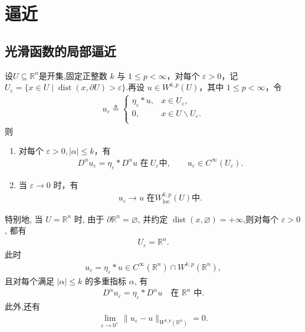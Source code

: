 \documentclass[../../main.tex]{subfiles}
\begin{document}
\section{逼近}\label{section:ch05-逼近}

\subsection{光滑函数的局部逼近}\label{subsection:ch05-内部逼近}

\begin{theorem}[光滑函数的局部逼近定理]\label{theorem:ch05-光滑函数的局部逼近定理}
设$U\subseteq \mathbb{R}^n$是开集,固定正整数 $k$ 与 $1\leqslant p<\infty$，对每个 $\varepsilon>0$，记$U_{\varepsilon}=\{x\in U\mid \operatorname{dist}(x,\partial U)>\varepsilon\}$.再设 $u\in W^{k,p}(U)$，其中 $1\leqslant p<\infty$，令
\begin{align*}
u_{\varepsilon}\triangleq \begin{cases}
\eta _{\varepsilon}*u,&x\in U_{\varepsilon},\\
0,&x\in U\backslash U_{\varepsilon}.\\
\end{cases}
\end{align*}
则
\begin{enumerate}[(1)]
\item 对每个 $\varepsilon>0,|\alpha|\leqslant k$，有
\begin{align*}
D^{\alpha}u_{\varepsilon}=\eta_{\varepsilon}*D^{\alpha}u\,\,\text{在}\ U_{\varepsilon}\text{中},\qquad u_{\varepsilon}\in C^{\infty}(U_{\varepsilon}).
\end{align*}

\item 当 $\varepsilon\to 0$ 时，有
\begin{align*}
u_{\varepsilon}\to u \,\,\text{在}W^{k,p}_{\mathrm{loc}}(U)\text{中}.
\end{align*}
\end{enumerate}
特别地, 当 $U=\mathbb{R}^n$ 时, 由于 $\partial\mathbb{R}^n=\varnothing$, 并约定 $\operatorname{dist}(x,\varnothing)=+\infty$,则对每个 $\varepsilon>0$, 都有
\begin{align*}
U_\varepsilon=\mathbb{R}^n.
\end{align*}
此时
\begin{align*}
u_\varepsilon=\eta_\varepsilon*u
\in C^\infty(\mathbb{R}^n)\cap W^{k,p}(\mathbb{R}^n),
\end{align*}
且对每个满足 $|\alpha|\leqslant k$ 的多重指标 $\alpha$, 有
\begin{align*}
D^\alpha u_\varepsilon
=\eta_\varepsilon*D^\alpha u
\quad\text{在 }\mathbb{R}^n\text{ 中}.
\end{align*}
此外,还有
\begin{align*}
\lim\limits_{\varepsilon\to0^+}
\|u_\varepsilon-u\|_{W^{k,p}(\mathbb{R}^n)}
=0.
\end{align*}
\end{theorem}
\end{document}
